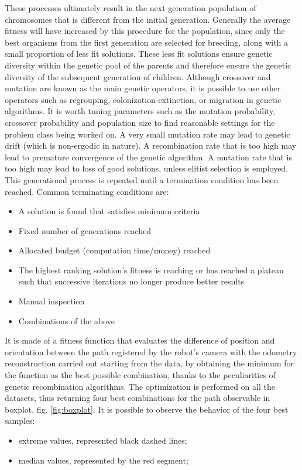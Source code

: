 These processes ultimately result in the next generation population of chromosomes that is different from the initial generation. Generally the average fitness will have increased by this procedure for the population, since only the best organisms from the first generation are selected for breeding, along with a small proportion of less fit solutions. These less fit solutions ensure genetic diversity within the genetic pool of the parents and therefore ensure the genetic diversity of the subsequent generation of children.
Although crossover and mutation are known as the main genetic operators, it is possible to use other operators such as regrouping, colonization-extinction, or migration in genetic algorithms.
It is worth tuning parameters such as the mutation probability, crossover probability and population size to find reasonable settings for the problem class being worked on. A very small mutation rate may lead to genetic drift (which is non-ergodic in nature). A recombination rate that is too high may lead to premature convergence of the genetic algorithm. A mutation rate that is too high may lead to loss of good solutions, unless elitist selection is employed.
This generational process is repeated until a termination condition has been reached. Common terminating conditions are:
\begin{itemize}
\item A solution is found that satisfies minimum criteria
\item Fixed number of generations reached
\item Allocated budget (computation time/money) reached
\item The highest ranking solution's fitness is reaching or has reached a plateau such that successive iterations no longer produce better results
\item Manual inspection
\item Combinations of the above
\end{itemize}
\noindent It is made of a fitness function that evaluates the difference of position and orientation between the path registered by the robot's camera with the odometry reconstruction carried out starting from the data, by obtaining the minimum for the function as the best possible combination, thanks to the peculiarities of genetic recombination algorithms.
The optimization is performed on all the datasets, thus returning four best combinations for the path observable in boxplot, fig. \ref{fig:boxplot}. It is possible to observe the behavior of the four best samples:
\begin{itemize}
\item extreme values, represented black dashed lines;
\item median values, represented by the red segment;
\end{itemize}
